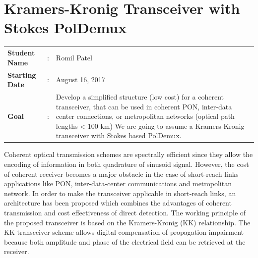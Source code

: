\clearpage
\section{Kramers-Kronig Transceiver  with Stokes PolDemux}

\begin{tcolorbox}	
\begin{tabular}{p{2.75cm} p{0.2cm} p{10.5cm}} 	
\textbf{Student Name}  &:& Romil Patel\\
\textbf{Starting Date} &:& August 16, 2017\\
\textbf{Goal}          &:& Develop a simplified structure (low cost) for a coherent transceiver, that can be used in coherent PON, inter-data center connections, or metropolitan networks (optical path lengths < 100 km) We are going to assume a Kramers-Kronig transceiver with Stokes based PolDemux.
\end{tabular}
\end{tcolorbox}

Coherent optical transmission schemes are spectrally efficient since they allow the encoding of information in both quadrature of sinusoid signal. However, the cost of coherent receiver becomes a major obstacle in the case of short-reach links applications like PON, inter-data-center communications and metropolitan network. In order to make the transceiver applicable in short-reach links, an architecture has been proposed which combines the advantages of coherent transmission and cost effectiveness of direct detection. The working principle of the proposed transceiver is based on the Kramers-Kronig (KK) relationship. The KK transceiver scheme allows digital compensation of propagation impairment because both amplitude and phase of the electrical field can be retrieved at the receiver. 
